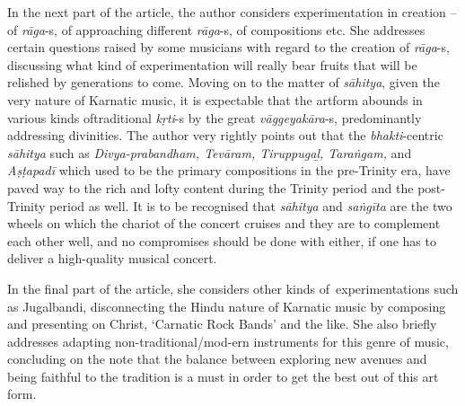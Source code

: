 In the next part of the article, the author considers experimentation in creation – of \textit{rāga}-s, of approaching different \textit{rāga}-s, of compositions etc. She addresses certain questions raised by some musicians with regard to the creation of \textit{rāga}-s, discussing what kind of experimentation will really bear fruits that will be relished by generations to come. Moving on to the matter of \textit{sāhitya}, given the very nature of Karnatic music, it is expectable that the artform abounds in various kinds of\break traditional \textit{kṛti}-s by the great \textit{vāggeyakāra}-s, predominantly addressing divinities. The author very rightly points out that the \textit{bhakti}-centric \textit{sāhitya} such as \textit{Divya-prabandham, Tevāram, Tiruppugaḻ, Taraṅgam, }and\textit{ Aṣṭapadī} which used to be the primary compositions in the pre-Trinity era, have paved way to the rich and lofty content during the Trinity period and the post-Trinity period as well. It is to be recognised that \textit{sāhitya} and \textit{saṅgīta} are the two wheels on which the chariot of the concert cruises and they are to complement each other well, and no compromises should be done with either, if one has to deliver a high-quality musical concert.

In the final part of the article, she considers other kinds of~experimentations such as Jugalbandi, disconnecting the Hindu nature of Karnatic music by composing and presenting on Christ, ‘Carnatic Rock Bands’ and the like. She also briefly addresses adapting non-traditional/mod-ern instruments for this genre of music, concluding on the note that the balance between exploring new avenues and being faithful to the tradition is a must in order to get the best out of this art form.

